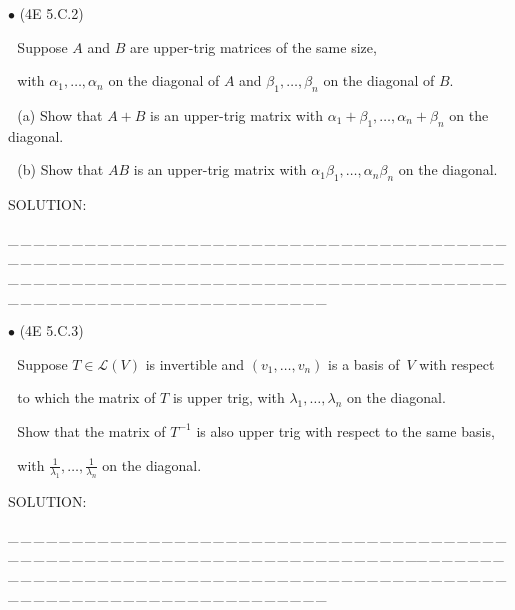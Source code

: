 \documentclass[a4paper, 11pt, UTF8]{article}
\def\Lm{\mathcal{L}}
\begin{document}
\begin{large}
{\small $\bullet$} (\normalsize{4E 5.C.2})\par\,\, {\timessl\Large 
Suppose $A$ and $B$ are upper-trig matrices of the same size,}\par\,\,
{\timessl\Large with $\alpha_1 , \dots , \alpha_n$ on the diagonal of $A$ and $\beta_1 , \dots , \beta_n$ on the diagonal of $B$.
}\par\,\,
(a) {\timessl\Large Show that $A + B$ is an upper-trig matrix with $\alpha_1 + \beta_1 , \dots , \alpha_n + \beta_n$ on the diagonal.
}\par\,\,
(b) {\timessl\Large Show that $AB$ is an upper-trig matrix with $\alpha_1 \beta_1 , \dots , \alpha_n \beta_n$ on the diagonal.
}\par
{\timesbf S\footnotesize{OLUTION:}}\par\quad

\par
{\tiny \_\,\_\,\_\,\_\,\_\,\_\,\_\,\_\,\_\,\_\,\_\,\_\,\_\,\_\,\_\,\_\,\_\,\_\,\_\,\_\,\_\,\_\,\_\,\_\,\_\,\_\,\_\,\_\,\_\,\_\,\_\,\_\,\_\,\_\,\_\,\_\,\_\,\_\,\_\,\_\,\_\,\_\,\_\,\_\,\_\,\_\,\_\,\_\,\_\,\_\,\_\,\_\,\_\,\_\,\_\,\_\,\_\,\_\,\_\,\_\,\_\,\_\,\_\,\_\,\_\,\_\,\_\,\_\,\_\,\_\,\_\_\,\_\,\_\,\_\,\_\,\_\,\_\,\_\,\_\,\_\,\_\,\_\,\_\,\_\,\_\,\_\,\_\,\_\,\_\,\_\,\_\,\_\,\_\,\_\,\_\,\_\,\_\,\_\,\_\,\_\,\_\,\_\,\_\,\_\,\_\,\_\,\_\,\_\,\_\,\_\,\_\,\_\,\_\,\_\,\_\,\_\,\_\,\_\,\_\,\_\,\_\,\_\,\_\,\_\,\_\,\_\,\_\,\_\,\_\,\_\,\_\,\_\,\_\,\_\,\_\,\_\,\_\,\_\,\_\,\_\,\_}\par

{\small $\bullet$} (\normalsize{4E 5.C.3})\par\,\, {\timessl\Large 
Suppose $T\in \Lm(V)$ is invertible and $(v_1 , \dots , v_n)$ is a basis of \,$V$ with respect}\par\,\,
{\timessl\Large to which the matrix of $T$ is upper trig, with $\lambda_1 , \dots , \lambda_n$ on the diagonal.}\par\,\,
{\timessl\Large
Show that the matrix of $T^{-1}$ is also upper trig with respect to the same basis,}\par\,\,
{\timessl\Large with
{\normalsize$\displaystyle\frac{1}{\lambda_1},\dots,\frac{1}{\lambda_n}$} on the diagonal.
}\par
{\timesbf S\footnotesize{OLUTION:}}\par\quad

\par
{\tiny \_\,\_\,\_\,\_\,\_\,\_\,\_\,\_\,\_\,\_\,\_\,\_\,\_\,\_\,\_\,\_\,\_\,\_\,\_\,\_\,\_\,\_\,\_\,\_\,\_\,\_\,\_\,\_\,\_\,\_\,\_\,\_\,\_\,\_\,\_\,\_\,\_\,\_\,\_\,\_\,\_\,\_\,\_\,\_\,\_\,\_\,\_\,\_\,\_\,\_\,\_\,\_\,\_\,\_\,\_\,\_\,\_\,\_\,\_\,\_\,\_\,\_\,\_\,\_\,\_\,\_\,\_\,\_\,\_\,\_\,\_\_\,\_\,\_\,\_\,\_\,\_\,\_\,\_\,\_\,\_\,\_\,\_\,\_\,\_\,\_\,\_\,\_\,\_\,\_\,\_\,\_\,\_\,\_\,\_\,\_\,\_\,\_\,\_\,\_\,\_\,\_\,\_\,\_\,\_\,\_\,\_\,\_\,\_\,\_\,\_\,\_\,\_\,\_\,\_\,\_\,\_\,\_\,\_\,\_\,\_\,\_\,\_\,\_\,\_\,\_\,\_\,\_\,\_\,\_\,\_\,\_\,\_\,\_\,\_\,\_\,\_\,\_\,\_\,\_\,\_\,\_}\par


\end{large}
\end{document}
